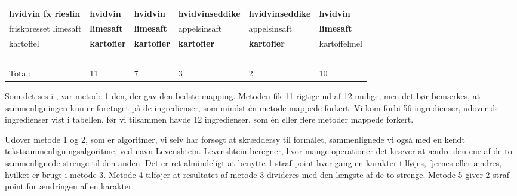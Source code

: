\begin{table}
\begin{tabular}{|p{2cm}|p{2cm}|p{2cm}|p{2cm}|p{2cm}|p{2cm}|}
        hvidvin fx rieslin                                         & \textbf{hvidvin}         & \textbf{hvidvin}                 & hvidvinseddike     & hvidvinseddike     & \textbf{hvidvin}         \\ \hline
        friskpresset limesaft                                      & \textbf{limesaft}        & \textbf{limesaft}                & appelsinsaft       & appelsinsaft       & \textbf{limesaft}        \\ \hline
        kartoffel                                                  & \textbf{kartofler}       & \textbf{kartofler}               & \textbf{kartofler}          & \textbf{kartofler}          & kartoffelmel    \\ \hline
        ~                                                          & ~               & ~                       & ~                  & ~                  & ~               \\ \hline
        Total:                                                     & 11              & 7                       & 3                  & 2                  & 10              \\
        \hline
    \end{tabular}
    \label{table:test-af-compares}
\end{table}

Som det ses i , var metode 1 den, der gav den bedste mapping. Metoden fik 11 rigtige ud af 12 mulige, men det bør bemærkes, at sammenligningen kun er foretaget på de ingredienser, som mindst én metode mappede forkert. Vi kom forbi 56 ingredienser, udover de ingredienser vist i tabellen, før vi tilsammen havde 12 ingredienser, som én eller flere metoder mappede forkert. 

Udover metode 1 og 2, som er algoritmer, vi selv har forsøgt at skræddersy til formålet, sammenlignede vi også med en kendt tekstsammenligningsalgoritme, ved navn Levenshtein. Levenshtein beregner, hvor mange operationer det kræver at ændre den ene af de to sammenlignede strenge til den anden\cite{levenshtein}. Det er ret almindeligt at benytte 1 straf point hver gang en karakter tilføjes, fjernes eller ændres, hvilket er brugt i metode 3.  Metode 4 tilføjer at resultatet af metode 3 divideres med den længste af de to strenge. Metode 5 giver 2-straf point for ændringen af en karakter.
 
